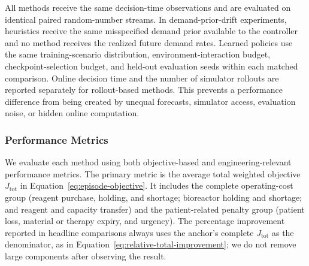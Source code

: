 \documentclass[preprint,review,12pt]{elsarticle}
\begin{document}
All methods receive the same decision-time observations and are evaluated on
identical paired random-number streams. In demand-prior-drift experiments,
heuristics receive the same misspecified demand prior available to the
controller and no method receives the realized future demand rates. Learned
policies use the same training-scenario distribution, environment-interaction
budget, checkpoint-selection budget, and held-out evaluation seeds within each
matched comparison. Online decision time and the number of simulator rollouts
are reported separately for rollout-based methods. This prevents a performance
difference from being created by unequal forecasts, simulator access,
evaluation noise, or hidden online computation.

\subsubsection{Performance Metrics}

We evaluate each method using both objective-based and
engineering-relevant performance metrics. The primary metric is the average
total weighted objective $J_{\mathrm{tot}}$ in
Equation~\eqref{eq:episode-objective}. It includes the complete operating-cost
group (reagent purchase, holding, and shortage; bioreactor holding and
shortage; and reagent and capacity transfer) and the patient-related penalty
group (patient loss, material or therapy expiry, and urgency). The percentage
improvement reported in headline comparisons always uses the anchor's complete
$J_{\mathrm{tot}}$ as the denominator, as in
Equation~\eqref{eq:relative-total-improvement}; we do not remove large
components after observing the result.
\end{document}

